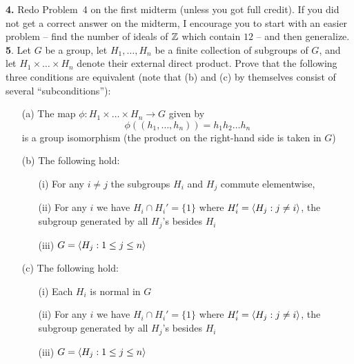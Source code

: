 \documentclass[12pt]{amsart}
\begin{document}
\skv
{\bf 4.} Redo Problem~4 on the first midterm (unless you got full credit). If you did not get a correct answer on the midterm, I encourage you
to start with an easier problem -- find the number of ideals of ${\mathbb Z}$ which contain $12$ -- and then generalize.
\skv
{\bf 5}. Let $G$ be a group, let $H_1,\ldots, H_n$ be a finite collection of subgroups of $G$, and let $H_1\times \ldots \times H_n$ denote
their external direct product. Prove that the following three conditions are equivalent (note that (b) and (c)
by themselves consist of several ``subconditions''):
\begin{itemize}
\item[(a)] The map $\phi:H_1\times \ldots \times H_n\to G$ given by $$\phi((h_1,\ldots, h_n))=h_1 h_2\ldots h_n$$ is a group isomorphism (the product on the right-hand side is taken in $G$)  
\item[(b)] The following hold:
\begin{itemize}
\item[(i)] For any $i\neq j$ the subgroups $H_i$ and $H_j$ commute elementwise, 
\item[(ii)] For any $i$ we have $H_i\cap H_i '=\{1\}$ where $H_i ' ={\langle} H_j: j\neq i{\rangle}$, the subgroup generated by all $H_j$'s besides $H_i$ 
\item[(iii)] $G={\langle} H_j: 1\leq j\leq n{\rangle}$  
\end{itemize}
\item[(c)] The following hold:
\begin{itemize}
\item[(i)] Each $H_i$ is normal in $G$ 
\item[(ii)] For any $i$ we have $H_i\cap H_i '=\{1\}$ where $H_i ' ={\langle} H_j: j\neq i{\rangle}$, the subgroup generated by all $H_j$'s besides $H_i$ 
\item[(iii)] $G={\langle} H_j: 1\leq j\leq n {\rangle}$  
\end{itemize}
\end{itemize}
\end{document}
